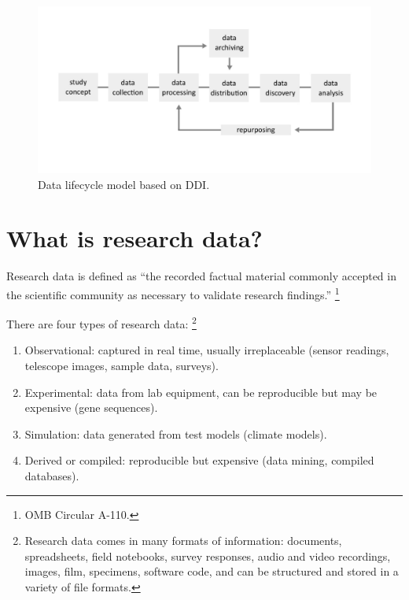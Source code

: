 \documentclass{tufte-handout}
\begin{document}
\begin{figure}
  \includegraphics{ddilifecycle.pdf}
  \caption{Data lifecycle model based on DDI.}
  \label{fig:textfig}
\end{figure}

\section{What is research data?}\label{what-is-research-data}

Research data is defined as ``the recorded factual material commonly
accepted in the scientific community as necessary to validate research
findings.'' \footnote {OMB Circular A-110.}

There are four types of research data: \footnote {Research data comes in many formats of information: documents,
spreadsheets, field notebooks, survey responses, audio and video
recordings, images, film, specimens, software code, and can be
structured and stored in a variety of file formats.}

\begin{enumerate}
\def\labelenumi{\arabic{enumi}.}
\itemsep1pt\parskip0pt
\item
  Observational: captured in real time, usually irreplaceable (sensor readings, telescope images, sample data, surveys).
\item
  Experimental: data from lab equipment, can be reproducible but may be expensive (gene sequences).
\item
  Simulation: data generated from test models (climate models).
\item
  Derived or compiled: reproducible but expensive (data mining, compiled databases).
\end{enumerate}
\end{document}
